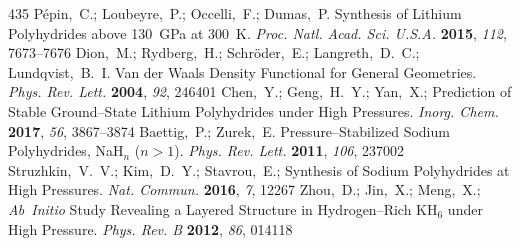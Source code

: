 \documentclass[12pt,letterpaper,oneside]{article}
\begin{document}
\begin{mcitethebibliography}{435}
{\mcitedefaultendpunct}{\mcitedefaultseppunct}\relax
\EndOfBibitem
{}
P\'epin,~C.; Loubeyre,~P.; Occelli,~F.; Dumas,~P. Synthesis of Lithium
  Polyhydrides above 130~GPa at 300~K. \emph{Proc. Natl. Acad. Sci. U.S.A.}
  \textbf{2015}, \emph{112}, 7673--7676\relax
\mciteBstWouldAddEndPuncttrue
\mciteSetBstMidEndSepPunct{\mcitedefaultmidpunct}
{\mcitedefaultendpunct}{\mcitedefaultseppunct}\relax
\EndOfBibitem
{}
Dion,~M.; Rydberg,~H.; Schr{\"o}der,~E.; Langreth,~D.~C.; Lundqvist,~B.~I. Van
  der Waals Density Functional for General Geometries. \emph{Phys. Rev. Lett.}
  \textbf{2004}, \emph{92}, 246401\relax
\mciteBstWouldAddEndPuncttrue
\mciteSetBstMidEndSepPunct{\mcitedefaultmidpunct}
{\mcitedefaultendpunct}{\mcitedefaultseppunct}\relax
\EndOfBibitem
{}
Chen,~Y.; Geng,~H.~Y.; Yan,~X.;   Prediction of
  Stable Ground--State Lithium Polyhydrides under High Pressures. \emph{Inorg.
  Chem.} \textbf{2017}, \emph{56}, 3867--3874\relax
\mciteBstWouldAddEndPuncttrue
\mciteSetBstMidEndSepPunct{\mcitedefaultmidpunct}
{\mcitedefaultendpunct}{\mcitedefaultseppunct}\relax
\EndOfBibitem
{}
Baettig,~P.; Zurek,~E. Pressure--Stabilized Sodium Polyhydrides, NaH$_n$
  ($n>1$). \emph{Phys. Rev. Lett.} \textbf{2011}, \emph{106}, 237002\relax
\mciteBstWouldAddEndPuncttrue
\mciteSetBstMidEndSepPunct{\mcitedefaultmidpunct}
{\mcitedefaultendpunct}{\mcitedefaultseppunct}\relax
\EndOfBibitem
{}
Struzhkin,~V.~V.; Kim,~D.~Y.; Stavrou,~E.;
    Synthesis of Sodium Polyhydrides at High Pressures.
  \emph{Nat. Commun.} \textbf{2016}, \emph{7}, 12267\relax
\mciteBstWouldAddEndPuncttrue
\mciteSetBstMidEndSepPunct{\mcitedefaultmidpunct}
{\mcitedefaultendpunct}{\mcitedefaultseppunct}\relax
\EndOfBibitem
{}
Zhou,~D.; Jin,~X.; Meng,~X.;   \emph{Ab~Initio} Study
  Revealing a Layered Structure in Hydrogen--Rich KH$_6$ under High Pressure.
  \emph{Phys. Rev. B} \textbf{2012}, \emph{86}, 014118\relax
\mciteBstWouldAddEndPuncttrue
\mciteSetBstMidEndSepPunct{\mcitedefaultmidpunct}
{\mcitedefaultendpunct}{\mcitedefaultseppunct}\relax

\end{mcitethebibliography}
\end{document}
